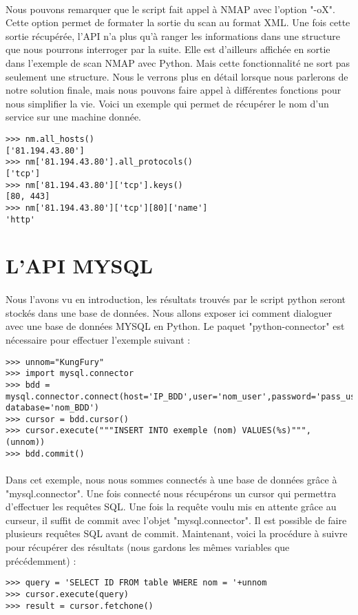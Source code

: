 \documentclass[12pt]{report}
\begin{document}
			\paragraph{}
				Nous pouvons remarquer que le script fait appel à NMAP avec l'option "-oX". Cette option permet de formater la sortie du scan au format XML. Une fois cette sortie récupérée, l'API n'a plus qu'à ranger les informations dans une structure que nous pourrons interroger par la suite. Elle est d'ailleurs affichée en sortie dans l'exemple de scan NMAP avec Python. Mais cette fonctionnalité ne sort pas seulement une structure. Nous le verrons plus en détail lorsque nous parlerons de notre solution finale, mais nous pouvons faire appel à différentes fonctions pour nous simplifier la vie. Voici un exemple qui permet de récupérer le nom d'un service sur une machine donnée.
				\begin{lstlisting}[caption=Récupération du nom d'un service, captionpos=b]
>>> nm.all_hosts()
['81.194.43.80']
>>> nm['81.194.43.80'].all_protocols()
['tcp']
>>> nm['81.194.43.80']['tcp'].keys()
[80, 443]
>>> nm['81.194.43.80']['tcp'][80]['name']
'http'
				\end{lstlisting}
		\section{L'API MYSQL}
			\paragraph{}
				Nous l'avons vu en introduction, les résultats trouvés par le script python seront stockés dans une base de données. Nous allons exposer ici comment dialoguer avec une base de données MYSQL en Python. Le paquet "python-connector" est nécessaire pour effectuer l'exemple suivant :
				\begin{lstlisting}[caption=Connexion à une base de données et insertion de données, captionpos=b]
>>> unnom="KungFury"
>>> import mysql.connector
>>> bdd = mysql.connector.connect(host='IP_BDD',user='nom_user',password='pass_user', database='nom_BDD')
>>> cursor = bdd.cursor()
>>> cursor.execute("""INSERT INTO exemple (nom) VALUES(%s)""", (unnom))
>>> bdd.commit()
				\end{lstlisting}
			\paragraph{}
				Dans cet exemple, nous nous sommes connectés à une base de données grâce à "mysql.connector". Une fois connecté nous récupérons un cursor qui permettra d'effectuer les requêtes SQL. Une fois la requête voulu mis en attente grâce au curseur, il suffit de commit avec l'objet "mysql.connector". Il est possible de faire plusieurs requêtes SQL avant de commit. Maintenant, voici la procédure à suivre pour récupérer des résultats (nous gardons les mêmes variables que précédemment) :
				\begin{lstlisting}[caption=Récupérationd de données, captionpos=b]
>>> query = 'SELECT ID FROM table WHERE nom = '+unnom
>>> cursor.execute(query)
>>> result = cursor.fetchone()
				\end{lstlisting}
\end{document}
